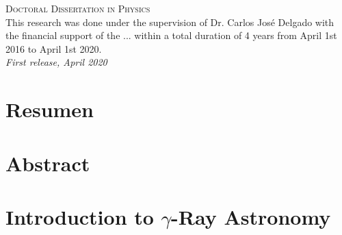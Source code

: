 \documentclass[12pt,fleqn,aas_macros]{book} %
\begin{document}

\noindent \textsc{Doctoral Dissertation in Physics}\\

\noindent This research was done under the supervision of Dr. Carlos José Delgado with the financial support of the ... within a total duration of 4 years from April 1st 2016 to April 1st 2020.\\ %

\noindent \textit{First release, April 2020} %



\newpage
\pagestyle{empty} %
\chapter*{Resumen}


\newpage
\pagestyle{empty} %
\chapter*{Abstract}







\pagestyle{empty} %

\tableofcontents %


\pagestyle{fancy} %




\chapter{Introduction to $\gamma$-Ray Astronomy} \label{cap:gammarayastro}

\end{document}

